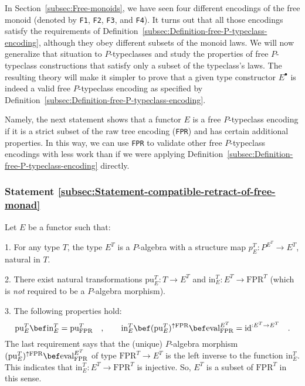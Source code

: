 In Section~\ref{subsec:Free-monoids}, we have seen four different
encodings of the free monoid (denoted by \lstinline!F1!,
\lstinline!F2!, \lstinline!F3!,
and \lstinline!F4!). It
turns out that all those encodings satisfy the requirements of Definition~\ref{subsec:Definition-free-P-typeclass-encoding},
although they obey different subsets of the monoid laws. We will now
generalize that situation to $P$-typeclasses and study the properties
of free $P$-typeclass constructions that satisfy only a subset of
the typeclass\textsf{'}s laws. The resulting theory will make it simpler to
prove that a given type constructor $E^{\bullet}$ is indeed a valid
free $P$-typeclass encoding as specified by Definition~\ref{subsec:Definition-free-P-typeclass-encoding}.

Namely, the next statement shows that a functor $E$ is a free $P$-typeclass
encoding if it is a strict subset of the raw tree encoding (\lstinline!FPR!)
and has certain additional properties. In this way, we can use \lstinline!FPR!
to validate other free $P$-typeclass encodings with less work than
if we were applying Definition~\ref{subsec:Definition-free-P-typeclass-encoding}
directly.

\subsubsection{Statement \label{subsec:Statement-compatible-retract-of-free-monad}\ref{subsec:Statement-compatible-retract-of-free-monad}}

Let $E$ be a functor such that:

1. For any type $T$, the type $E^{T}$ is a $P$-algebra with a structure
map $p_{E}^{T}:P^{E^{T}}\rightarrow E^{T}$, natural in $T$. 

2. There exist natural transformations $\text{pu}_{E}^{T}:T\rightarrow E^{T}$
and $\text{in}_{E}^{T}:E^{T}\rightarrow\text{FPR}^{T}$ (which is
\emph{not} required to be a $P$-algebra morphism).

3. The following properties hold:
\begin{equation}
\text{pu}_{E}^{T}\bef\text{in}_{E}^{T}=\text{pu}_{\text{FPR}}^{T}\quad,\quad\quad\text{in}_{E}^{T}\bef(\text{pu}_{E}^{T})^{\uparrow\text{FPR}}\bef\text{eval}_{\text{FPR}}^{E^{T}}=\text{id}^{:E^{T}\rightarrow E^{T}}\quad.\label{eq:laws-of-in-E-free-P-typeclass-encoding}
\end{equation}
The last requirement says that the (unique) $P$-algebra morphism
$(\text{pu}_{E}^{T})^{\uparrow\text{FPR}}\bef\text{eval}_{\text{FPR}}^{E^{T}}$
of type $\text{FPR}^{T}\rightarrow E^{T}$ is the left inverse to
the function $\text{in}_{E}^{T}$. This indicates that $\text{in}_{E}^{T}:E^{T}\rightarrow\text{FPR}^{T}$
is injective. So, $E^{T}$ is a subset
of $\text{FPR}^{T}$ in this sense.

